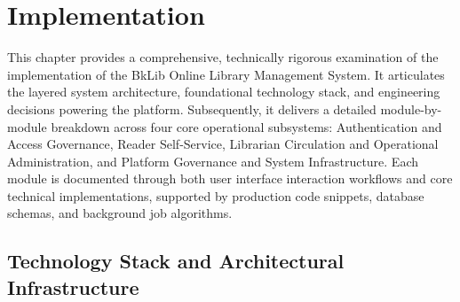 \begingroup
{}\selectfont
\section{Implementation}

This chapter provides a comprehensive, technically rigorous examination of the implementation of the BkLib Online Library Management System. It articulates the layered system architecture, foundational technology stack, and engineering decisions powering the platform. Subsequently, it delivers a detailed module-by-module breakdown across four core operational subsystems: Authentication and Access Governance, Reader Self-Service, Librarian Circulation and Operational Administration, and Platform Governance and System Infrastructure. Each module is documented through both user interface interaction workflows and core technical implementations, supported by production code snippets, database schemas, and background job algorithms.



\subsection{Technology Stack and Architectural Infrastructure}

